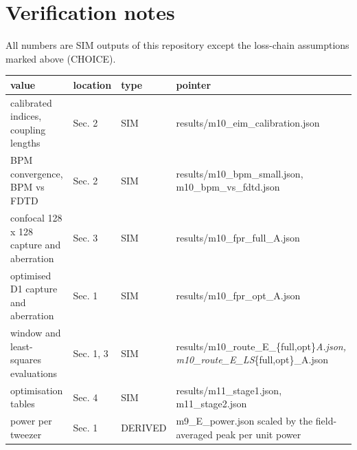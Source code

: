 \hypertarget{verification-notes}{%
\section{Verification notes}\label{fpr_design-verification-notes}}

All numbers are SIM outputs of this repository except the loss-chain
assumptions marked above (CHOICE).

{\footnotesize
\begin{longtable}[]{@{}>{\raggedright\arraybackslash}p{0.211\dimexpr(\linewidth-8\tabcolsep)\relax}>{\raggedright\arraybackslash}p{0.113\dimexpr(\linewidth-8\tabcolsep)\relax}>{\raggedright\arraybackslash}p{0.098\dimexpr(\linewidth-8\tabcolsep)\relax}>{\raggedright\arraybackslash}p{0.577\dimexpr(\linewidth-8\tabcolsep)\relax}@{}}
\toprule\noalign{}
value & location & type & pointer \\
\midrule\noalign{}
\endhead
\bottomrule\noalign{}
\endlastfoot
calibrated indices, coupling lengths & Sec. 2 & SIM &
results/m10\_eim\_calibration.json \\
BPM convergence, BPM vs FDTD & Sec. 2 & SIM &
results/m10\_bpm\_small.json, m10\_bpm\_vs\_fdtd.json \\
confocal 128 x 128 capture and aberration & Sec. 3 & SIM &
results/m10\_fpr\_full\_A.json \\
optimised D1 capture and aberration & Sec. 1 & SIM &
results/m10\_fpr\_opt\_A.json \\
window and least-squares evaluations & Sec. 1, 3 & SIM &
results/m10\_route\_E\_\{full,opt\}\emph{A.json,
m10\_route\_E\_LS}\{full,opt\}\_A.json \\
optimisation tables & Sec. 4 & SIM & results/m11\_stage1.json,
m11\_stage2.json \\
power per tweezer & Sec. 1 & DERIVED & m9\_E\_power.json scaled by the
field-averaged peak per unit power \\
\end{longtable}
}
